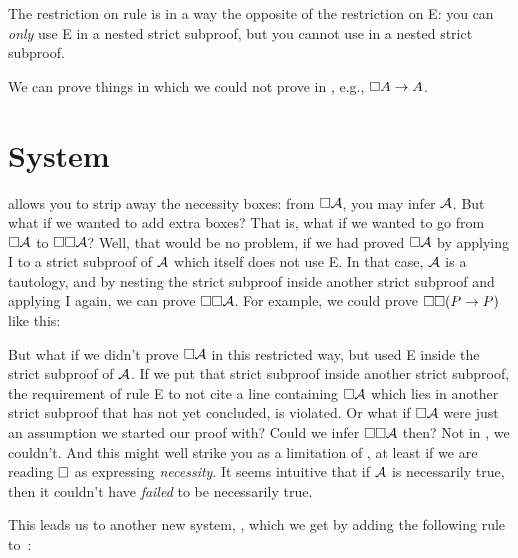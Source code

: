 The restriction on rule \mlT{} is in a way the opposite of the restriction on \ebox E: you can \emph{only} use \ebox E in a nested strict subproof, but you cannot use \mlT{} in a nested strict subproof.

We can prove things in \mlT{} which we could not prove in \mlK, e.g., $\Box A \rightarrow A$.

\section{System \mlSfour}
\label{S4}

\mlT{} allows you to strip away the necessity boxes: from $\Box \mathcal{A}$, you may infer $\mathcal{A}$. But what if we wanted to add extra boxes? That is, what if we wanted to go from $\Box\mathcal{A}$ to $\Box\Box\mathcal{A}$? Well, that would be no problem, if we had proved $\Box\mathcal{A}$ by applying \ebox I to a strict subproof of $\mathcal{A}$ which itself does not use \ebox E. In that case, $\mathcal{A}$ is a tautology, and by nesting the strict subproof inside another strict subproof and applying \ebox I again, we can prove $\Box\Box \mathcal{A}$. For example, we could prove $\Box\Box (P\rightarrow P)$ like this:
\begin{fitchproof}
		\open
		\AS
		\open
		\AS
		\open
		\AS
		\close
		\close
		\close
\end{fitchproof}
But what if we didn't prove $\Box\mathcal{A}$ in this restricted way, but used \ebox E inside the strict subproof of $\mathcal{A}$. If we put that strict subproof inside another strict subproof, the requirement of rule \ebox E to not cite a line containing $\Box\mathcal{A}$ which lies in another strict subproof that has not yet concluded, is violated.  Or what if $\Box\mathcal{A}$ were just an assumption we started our proof with? Could we infer $\Box\Box\mathcal{A}$ then? Not in  \mlT, we couldn't. And this might well strike you as a limitation of  \mlT, at least if we are reading $\Box$ as expressing \emph{necessity}. It seems intuitive that if $\mathcal{A}$ is necessarily true, then it couldn't have \emph{failed} to be necessarily true.

This leads us to another new system, \mlSfour, which we get by adding the following rule to~\mlT:

